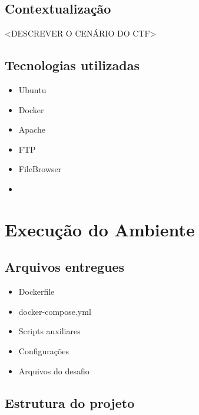 \subsection{Contextualização}

<DESCREVER O CENÁRIO DO CTF>

\vspace{1em}

\subsection{Tecnologias utilizadas}

\begin{itemize}
    \item Ubuntu
    \item Docker
    \item Apache
    \item FTP
    \item FileBrowser
    \item <OUTRAS TECNOLOGIAS>
\end{itemize}


\section{Execução do Ambiente}

\subsection{Arquivos entregues}

\begin{itemize}
    \item Dockerfile
    \item docker-compose.yml
    \item Scripts auxiliares
    \item Configurações
    \item Arquivos do desafio
\end{itemize}

\subsection{Estrutura do projeto}

\begin{lstlisting}


\end{lstlisting}

